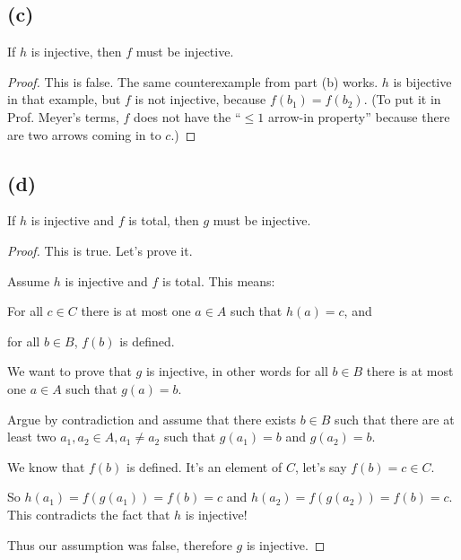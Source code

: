 \documentclass[14pt]{extarticle}
\begin{document}
\subsection{(c)}
If $h$ is injective, then $f$ must be injective.
\begin{proof}
This is false. The same counterexample from part (b) works. $h$ is bijective in that example, but $f$ is not injective, because $f(b_1) = f(b_2)$. (To put it in Prof. Meyer's terms, $f$ does not have the ``$\leq 1$ arrow-in property'' because there are two arrows coming in to $c$.)
\end{proof}

\subsection{(d)}
If $h$ is injective and $f$ is total, then $g$ must be injective.
\begin{proof}
This is true. Let's prove it.

Assume $h$ is injective and $f$ is total. This means:

For all $c \in C$ there is at most one $a \in A$ such that $h(a) = c$, and

for all $b \in B$, $f(b)$ is defined.

We want to prove that $g$ is injective, in other words for all $b \in B$ there is at most one $a \in A$ such that $g(a) = b$.

Argue by contradiction and assume that there exists $b \in B$ such that there are at least two $a_1, a_2 \in A, a_1 \neq a_2$ such that $g(a_1) = b$ and $g(a_2) = b$.

We know that $f(b)$ is defined. It's an element of $C$, let's say $f(b) = c \in C$.

So $h(a_1) = f(g(a_1)) = f(b) = c$ and $h(a_2) = f(g(a_2)) = f(b) = c$. This contradicts the fact that $h$ is injective!

Thus our assumption was false, therefore $g$ is injective.
\end{proof}
\end{document}
